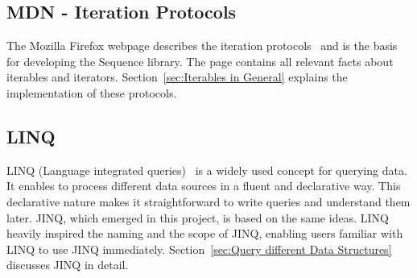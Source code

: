 \subsection{MDN - Iteration Protocols}
\label{sub:MDN - Iteration Protocols}
The Mozilla Firefox webpage describes the iteration
protocols~\cite{mdn_protocols} and is the basis for developing the Sequence
library. The page contains all relevant facts about iterables and iterators.
Section~\ref{sec:Iterables in General} explains the implementation
of these protocols.

\subsection{LINQ}
\label{sub:LINQ}
LINQ (Language integrated queries)~\cite{billwagner_language-integrated_2023}
is a widely used concept for querying data. It enables to process different
data sources in a fluent and declarative way. This declarative nature makes it
straightforward to write queries and understand them later. JINQ, which emerged
in this project, is based on the same ideas. LINQ heavily inspired the naming
and the scope of JINQ, enabling users familiar with LINQ to use JINQ
immediately. Section~\ref{sec:Query different Data Structures} discusses JINQ
in detail.
